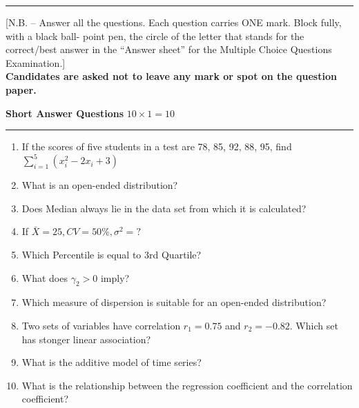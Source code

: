 \documentclass[12pt]{exam}
\begin{document}
\hrule

\begin{center}
[N.B. – Answer all the questions. Each question carries ONE mark. Block fully, with a black ball- point pen, the circle of the letter that stands for the correct/best answer in the “Answer sheet” for the Multiple Choice Questions Examination.]\\

  
  \textbf{Candidates are asked not to leave any mark or spot on the question paper.}
\end{center}

\textbf{Short Answer Questions} \hfill $10 \times 1 =10$
\hrule
\begin{enumerate}
  \item If the scores of five students in a test are 78, 85, 92, 88, 95, 
find $\displaystyle \sum_{i=1}^5 (x_i^2 - 2x_i + 3)$  \underline{\hspace{3cm}}
  \item What is an open-ended distribution?  \underline{\hspace{3cm}}
  \item Does Median always lie in the data set from which it is calculated?  \underline{\hspace{3cm}}
  \item If $\bar X = 25, CV = 50\%, \sigma^2=?$  \underline{\hspace{3cm}}
  \item Which Percentile is equal to 3rd Quartile?  \underline{\hspace{3cm}}
  \item What does $\gamma_2>0$ imply?  \underline{\hspace{3cm}}
  \item Which measure of dispersion is suitable for an open-ended distribution?       \underline{\hspace{3cm}}
   \item Two sets of variables have correlation $r_1 = 0.75$ and $r_2 = -0.82$. Which set has stonger linear association?  \underline{\hspace{3cm}}
   \item What is the additive model of time series?   \underline{\hspace{3cm}}
   \item What is the relationship between the regression coefficient and the correlation coefficient?  \underline{\hspace{3cm}}
\end{enumerate}
\end{document}
